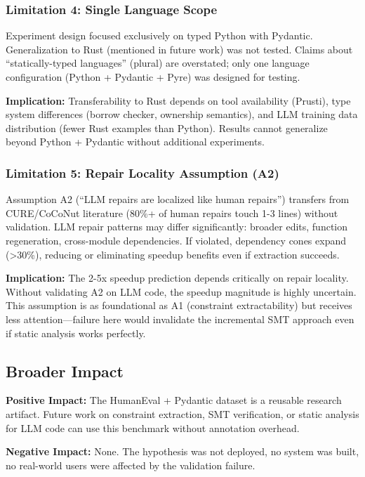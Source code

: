 \subsubsection{Limitation 4: Single Language Scope}

Experiment design focused exclusively on typed Python with Pydantic. Generalization to Rust (mentioned in future work) was not tested. Claims about ``statically-typed languages'' (plural) are overstated; only one language configuration (Python + Pydantic + Pyre) was designed for testing.

\textbf{Implication:} Transferability to Rust depends on tool availability (Prusti), type system differences (borrow checker, ownership semantics), and LLM training data distribution (fewer Rust examples than Python). Results cannot generalize beyond Python + Pydantic without additional experiments.

\subsubsection{Limitation 5: Repair Locality Assumption (A2)}

Assumption A2 (``LLM repairs are localized like human repairs'') transfers from CURE/CoCoNut literature (80\%+ of human repairs touch 1-3 lines) without validation. LLM repair patterns may differ significantly: broader edits, function regeneration, cross-module dependencies. If violated, dependency cones expand (>30\%), reducing or eliminating speedup benefits even if extraction succeeds.

\textbf{Implication:} The 2-5x speedup prediction depends critically on repair locality. Without validating A2 on LLM code, the speedup magnitude is highly uncertain. This assumption is as foundational as A1 (constraint extractability) but receives less attention---failure here would invalidate the incremental SMT approach even if static analysis works perfectly.

\subsection{Broader Impact}

\textbf{Positive Impact:} The HumanEval + Pydantic dataset is a reusable research artifact. Future work on constraint extraction, SMT verification, or static analysis for LLM code can use this benchmark without annotation overhead.

\textbf{Negative Impact:} None. The hypothesis was not deployed, no system was built, no real-world users were affected by the validation failure.


